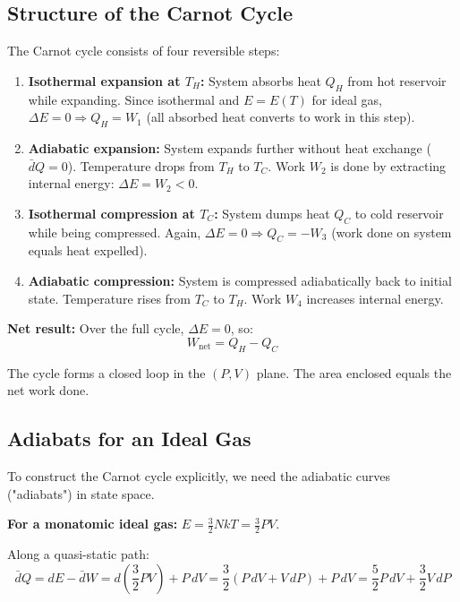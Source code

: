 \documentclass[9pt,twocoloumn]{article}
\begin{document}
\subsection{Structure of the Carnot Cycle}
The Carnot cycle consists of four reversible steps:

\begin{enumerate}
    \item \textbf{Isothermal expansion at $T_H$:} System absorbs heat $Q_H$ from hot reservoir while expanding. Since isothermal and $E = E(T)$ for ideal gas, $\Delta E = 0 \Rightarrow Q_H = W_1$ (all absorbed heat converts to work in this step).

    \item \textbf{Adiabatic expansion:} System expands further without heat exchange ($\bar{d}Q = 0$). Temperature drops from $T_H$ to $T_C$. Work $W_2$ is done by extracting internal energy: $\Delta E = W_2 < 0$.

    \item \textbf{Isothermal compression at $T_C$:} System dumps heat $Q_C$ to cold reservoir while being compressed. Again, $\Delta E = 0 \Rightarrow Q_C = -W_3$ (work done on system equals heat expelled).

    \item \textbf{Adiabatic compression:} System is compressed adiabatically back to initial state. Temperature rises from $T_C$ to $T_H$. Work $W_4$ increases internal energy.
\end{enumerate}

\textbf{Net result:} Over the full cycle, $\Delta E = 0$, so:
\begin{equation}
W_{\text{net}} = Q_H - Q_C
\end{equation}

The cycle forms a closed loop in the $(P, V)$ plane. The area enclosed equals the net work done.

\subsection{Adiabats for an Ideal Gas}
To construct the Carnot cycle explicitly, we need the adiabatic curves ("adiabats") in state space.

\textbf{For a monatomic ideal gas:} $E = \frac{3}{2} NkT = \frac{3}{2} PV$.

Along a quasi-static path:
\begin{equation}
\bar{d}Q = dE - \bar{d}W = d\left( \frac{3}{2} PV \right) + P \, dV = \frac{3}{2} (P \, dV + V \, dP) + P \, dV = \frac{5}{2} P \, dV + \frac{3}{2} V \, dP
\end{equation}
\end{document}
